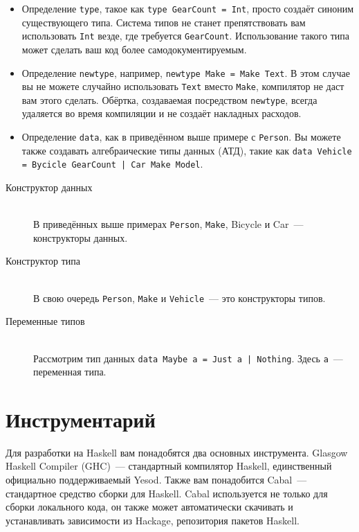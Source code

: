 \begin{itemize}
  \item Определение \lstinline'type', такое как \lstinline'type GearCount = Int', просто создаёт синоним существующего типа. Система типов не станет препятствовать вам использовать \lstinline'Int' везде, где требуется \lstinline'GearCount'. Использование такого типа может сделать ваш код более самодокументируемым.
  \item Определение \lstinline'newtype', например, \lstinline'newtype Make = Make Text'. В этом случае вы не можете случайно использовать \lstinline'Text' вместо \lstinline'Make', компилятор не даст вам этого сделать. Обёртка, создаваемая посредством \lstinline'newtype', всегда удаляется во время компиляции и не создаёт накладных расходов.
  \item Определение \lstinline'data', как в приведённом выше примере с \lstinline'Person'. Вы можете также создавать алгебраические типы данных (АТД), такие как \lstinline'data Vehicle = Bycicle GearCount | Car Make Model'.
\end{itemize}

\begin{description}
\item[Конструктор данных] \hfill \\
В приведённых выше примерах \lstinline'Person', \lstinline'Make', Bicycle и Car~--- конструкторы данных.

\item[Конструктор типа] \hfil \\
В свою очередь \lstinline'Person', \lstinline'Make' и \lstinline'Vehicle'~--- это конструкторы типов.

\item[Переменные типов] \hfill \\
Рассмотрим тип данных \lstinline'data Maybe a = Just a | Nothing'. Здесь \lstinline'a'~--- переменная типа.
\end{description}

\section{Инструментарий}

Для разработки на Haskell вам понадобятся два основных инструмента. Glasgow Haskell Compiler (GHC)~--- стандартный компилятор Haskell, единственный официально поддерживаемый Yesod. Также вам понадобится Cabal~--- стандартное средство сборки для Haskell. Cabal используется не только для сборки локального кода, он также может автоматически скачивать и устанавливать зависимости из Hackage, репозитория пакетов Haskell.

